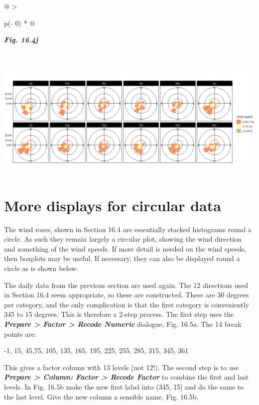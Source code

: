 \documentclass[
  letterpaper,
  DIV=11,
  numbers=noendperiod]{scrreprt}
\begin{document}
\begin{longtable}[]{@{}
  >{\raggedright\arraybackslash}p{(\columnwidth - 0\tabcolsep) * }@{}}
\toprule\noalign{}
\begin{minipage}[b]{\linewidth}\raggedright
\textbf{\emph{Fig. 16.4j}}
\end{minipage} \\
\midrule\noalign{}
\endhead
\bottomrule\noalign{}
\endlastfoot
\includegraphics[width=6.12463in,height=2.34915in]{figures/Fig16.4j.png} \\
\end{longtable}

\section{More displays for circular
data}\label{more-displays-for-circular-data}

The wind roses, shown in Section 16.4 are essentially stacked histograms
round a circle. As such they remain largely a circular plot, showing the
wind direction and something of the wind speeds. If more detail is
needed on the wind speeds, then boxplots may be useful. If necessary,
they can also be displayed round a circle as is shown below.

The daily data from the previous section are used again. The 12
directions used in Section 16.4 seem appropriate, so these are
constructed. These are 30 degrees per category, and the only
complication is that the first category is conveniently 345 to 15
degrees. This is therefore a 2-step process. The first step uses the
\textbf{\emph{Prepare \textgreater{} Factor \textgreater{} Recode
Numeric}} dialogue, Fig. 16.5a. The 14 break points are:

-1, 15, 45,75, 105, 135, 165, 195, 225, 255, 285, 315, 345, 361

This gives a factor column with 13 levels (not 12!). The second step is
to use \textbf{\emph{Prepare \textgreater{} Column: Factor
\textgreater{} Recode Factor}} to combine the first and last levels. In
Fig. 16.5b make the new first label into (345, 15{]} and do the same to
the last level. Give the new column a sensible name, Fig. 16.5b.
\end{document}
